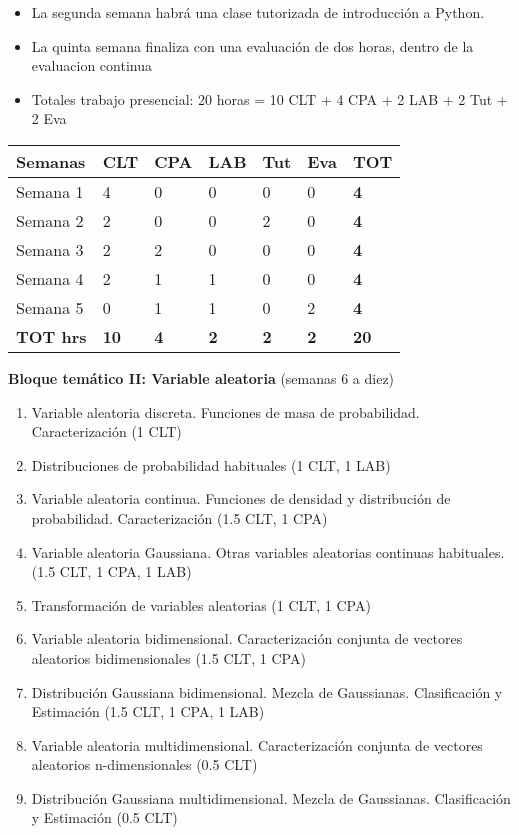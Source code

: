 \documentclass[11pt]{article}
\providecommand{\tightlist}{%
      \setlength{\itemsep}{0pt}\setlength{\parskip}{0pt}}
\begin{document}
    \begin{itemize}
\tightlist
\item
  La segunda semana habrá una clase tutorizada de introducción a Python.
\item
  La quinta semana finaliza con una evaluación de dos horas, dentro de
  la evaluacion continua
\item
  Totales trabajo presencial: 20 horas = 10 CLT + 4 CPA + 2 LAB + 2 Tut
  + 2 Eva
\end{itemize}

    \begin{longtable}[]{@{}lllllll@{}}
\toprule
\textbf{Semanas} & \textbf{CLT} & \textbf{CPA} & \textbf{LAB} &
\textbf{Tut} & \textbf{Eva} & \textbf{TOT}\tabularnewline
\midrule
\endhead
Semana 1 & 4 & 0 & 0 & 0 & 0 & \textbf{4}\tabularnewline
Semana 2 & 2 & 0 & 0 & 2 & 0 & \textbf{4}\tabularnewline
Semana 3 & 2 & 2 & 0 & 0 & 0 & \textbf{4}\tabularnewline
Semana 4 & 2 & 1 & 1 & 0 & 0 & \textbf{4}\tabularnewline
Semana 5 & 0 & 1 & 1 & 0 & 2 & \textbf{4}\tabularnewline
\textbf{TOT hrs} & \textbf{10} & \textbf{4} & \textbf{2} & \textbf{2} &
\textbf{2} & \textbf{20}\tabularnewline
\bottomrule
\end{longtable}

    

    \textbf{Bloque temático II: Variable aleatoria} (semanas 6 a diez)

\begin{enumerate}
\def\labelenumi{\arabic{enumi}.}
\tightlist
\item
  Variable aleatoria discreta. Funciones de masa de probabilidad.
  Caracterización (1 CLT)
\item
  Distribuciones de probabilidad habituales (1 CLT, 1 LAB)
\item
  Variable aleatoria continua. Funciones de densidad y distribución de
  probabilidad. Caracterización (1.5 CLT, 1 CPA)
\item
  Variable aleatoria Gaussiana. Otras variables aleatorias continuas
  habituales. (1.5 CLT, 1 CPA, 1 LAB)
\item
  Transformación de variables aleatorias (1 CLT, 1 CPA)
\item
  Variable aleatoria bidimensional. Caracterización conjunta de vectores
  aleatorios bidimensionales (1.5 CLT, 1 CPA)
\item
  Distribución Gaussiana bidimensional. Mezcla de Gaussianas.
  Clasificación y Estimación (1.5 CLT, 1 CPA, 1 LAB)
\item
  Variable aleatoria multidimensional. Caracterización conjunta de
  vectores aleatorios n-dimensionales (0.5 CLT)
\item
  Distribución Gaussiana multidimensional. Mezcla de Gaussianas.
  Clasificación y Estimación (0.5 CLT)
\end{enumerate}
\end{document}

